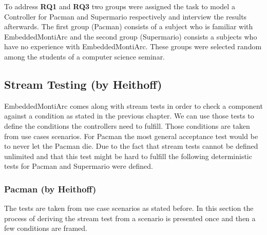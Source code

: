 To address \textbf{RQ1} and \textbf{RQ3} two groups were assigned the task to model a Controller for Pacman and Supermario respectively and interview the results afterwards. The first group (Pacman) consists of a subject who is familiar with EmbeddedMontiArc and the second group (Supermario) consists a subjects who have no experience with EmbeddedMontiArc. These groups were selected random among the students of a computer science seminar.
\subsection{Stream Testing (by Heithoff)}

EmbeddedMontiArc comes along with stream tests in order to check a component against a condition as stated in the previous chapter.
We can use those tests to define the conditions the controllers need to fulfill. Those conditions are taken from use cases scenarios. For Pacman the most general acceptance test would be to never let the Pacman die. Due to the fact that stream tests cannot be defined unlimited and that this test might be hard to fulfill the following deterministic tests for Pacman and Supermario were defined.

\subsubsection{Pacman (by Heithoff)}
The tests are taken from use case scenarios as stated before. In this section the process of deriving the stream test from a scenario is presented once and then a few conditions are framed. \newline

